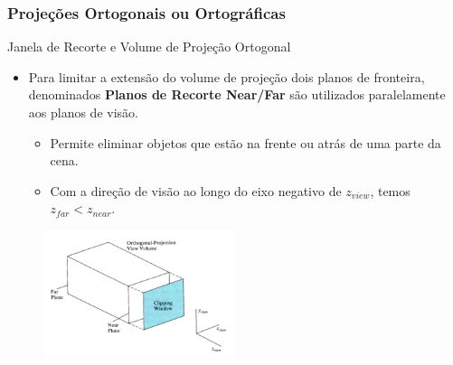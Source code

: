 \documentclass{beamer}
\begin{document}
\begin{frame}
\frametitle{Projeções Ortogonais ou Ortográficas}
	\begin{block}{Janela de Recorte e Volume de Projeção Ortogonal}
		\begin{itemize}
			\item Para limitar a extensão do volume de projeção dois planos de fronteira, denominados \textbf{Planos de Recorte Near/Far} são utilizados paralelamente aos planos de visão.
			\begin{itemize}
				\item Permite eliminar objetos que estão na frente ou atrás de uma parte da cena.
				\item Com a direção de visão ao longo do eixo negativo de $z_{view}$, temos $z_{far} < z_{near}$.
			\end{itemize}
		\end{itemize}
	\end{block}
	\begin{figure}[!h]
			\begin{center}
			\includegraphics[width=0.5\textwidth]{Figures/FarNea}
			\end{center}
	\end{figure}
\end{frame}


\end{document}
